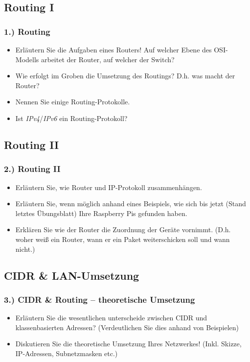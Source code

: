 \documentclass[xcolor=dvipsnames, aspectratio=169]{beamer}
\begin{document}
\subsection{Routing I}
\begin{frame}
\frametitle{1.) Routing}
	\begin{itemize}
		\item Erläutern Sie die Aufgaben eines Routers! Auf welcher Ebene des OSI-Modells arbeitet der Router, auf welcher der Switch?
		\item Wie erfolgt im Groben die Umsetzung des Routings? D.h. was macht der Router?
		\item Nennen Sie einige Routing-Protokolle.
		\item Ist \emph{IPv4}/\emph{IPv6} ein Routing-Protokoll?
	\end{itemize}
\end{frame}

\subsection{Routing II}
\begin{frame}
	\frametitle{2.) Routing II}
	\begin{itemize}
		\item Erläutern Sie, wie Router und IP-Protokoll zusammenhängen.
		\item Erläutern Sie, wenn möglich anhand eines Beispiels, wie sich bis jetzt (Stand letztes Übungsblatt) Ihre Raspberry Pis gefunden haben.
		\item Erklären Sie wie der Router die Zuordnung der Geräte vornimmt. (D.h. woher weiß ein Router, wann er ein Paket weiterschicken soll und wann nicht.)
	\end{itemize}
\end{frame}

\subsection{CIDR \& LAN-Umsetzung}
\begin{frame}
	\frametitle{3.) CIDR \& Routing -- theoretische Umsetzung}
	\begin{itemize}
		\item Erläutern Sie die wesentlichen unterscheide zwischen CIDR und klassenbasierten Adressen? (Verdeutlichen Sie dies anhand von Beispielen)
		\item Diskutieren Sie die theoretische Umsetzung Ihres Netzwerkes! (Inkl. Skizze, IP-Adressen, Subnetzmasken etc.)
	\end{itemize}
\end{frame}
\end{document}
